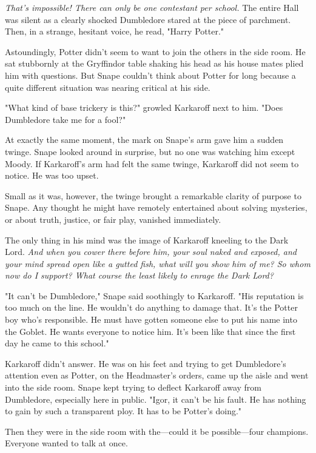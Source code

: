 \emph{That's impossible! There can only be one contestant per school.} The entire Hall was silent as a clearly shocked Dumbledore stared at the piece of parchment. Then, in a strange, hesitant voice, he read, "Harry Potter."

Astoundingly, Potter didn't seem to want to join the others in the side room. He sat stubbornly at the Gryffindor table shaking his head as his house mates plied him with questions. But Snape couldn't think about Potter for long because a quite different situation was nearing critical at his side.

"What kind of base trickery is this?" growled Karkaroff next to him. "Does Dumbledore take me for a fool?"

At exactly the same moment, the mark on Snape's arm gave him a sudden twinge. Snape looked around in surprise, but no one was watching him except Moody. If Karkaroff's arm had felt the same twinge, Karkaroff did not seem to notice. He was too upset.

Small as it was, however, the twinge brought a remarkable clarity of purpose to Snape. Any thought he might have remotely entertained about solving mysteries, or about truth, justice, or fair play, vanished immediately.

The only thing in his mind was the image of Karkaroff kneeling to the Dark Lord. \emph{And when you cower there before him, your soul naked and exposed, and your mind spread open like a gutted fish, what will you show him of me? So whom now do I support? What course the least likely to enrage the Dark Lord?}

"It can't be Dumbledore," Snape said soothingly to Karkaroff. "His reputation is too much on the line. He wouldn't do anything to damage that. It's the Potter boy who's responsible. He must have gotten someone else to put his name into the Goblet. He wants everyone to notice him. It's been like that since the first day he came to this school."

Karkaroff didn't answer. He was on his feet and trying to get Dumbledore's attention even as Potter, on the Headmaster's orders, came up the aisle and went into the side room. Snape kept trying to deflect Karkaroff away from Dumbledore, especially here in public. "Igor, it can't be his fault. He has nothing to gain by such a transparent ploy. It has to be Potter's doing."

Then they were in the side room with the—could it be possible—four champions. Everyone wanted to talk at once.


